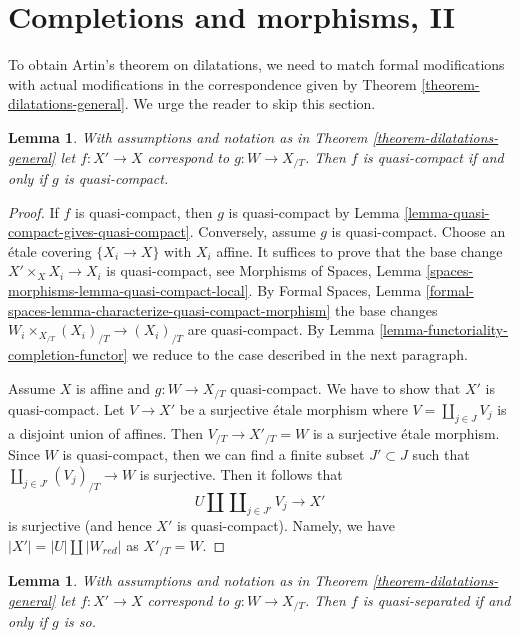 \documentclass{stacks-project}
\theoremstyle{plain}
\newtheorem{lemma}[subsection]{Lemma}
\theoremstyle{definition}
\theoremstyle{remark}
\numberwithin{equation}{subsection}
\begin{document}
\section{Completions and morphisms, II}
\label{section-completion-and-morphisms-bis}

\noindent
To obtain Artin's theorem on dilatations, we need to match
formal modifications with actual modifications in the correspondence
given by Theorem \ref{theorem-dilatations-general}.
We urge the reader to skip this section.

\begin{lemma}
\label{lemma-output-quasi-compact}
With assumptions and notation as in Theorem \ref{theorem-dilatations-general}
let $f : X' \to X$ correspond to $g : W \to X_{/T}$.
Then $f$ is quasi-compact if and only if $g$ is quasi-compact.
\end{lemma}

\begin{proof}
If $f$ is quasi-compact, then $g$ is quasi-compact by
Lemma \ref{lemma-quasi-compact-gives-quasi-compact}.
Conversely, assume $g$ is quasi-compact.
Choose an \'etale covering $\{X_i \to X\}$ with $X_i$ affine.
It suffices to prove that the base change $X' \times_X X_i \to X_i$
is quasi-compact, see
Morphisms of Spaces, Lemma \ref{spaces-morphisms-lemma-quasi-compact-local}.
By Formal Spaces, Lemma
\ref{formal-spaces-lemma-characterize-quasi-compact-morphism}
the base changes $W_i \times_{X_{/T}} (X_i)_{/T}  \to (X_i)_{/T}$
are quasi-compact.
By Lemma \ref{lemma-functoriality-completion-functor}
we reduce to the case described in the next paragraph.

\medskip\noindent
Assume $X$ is affine and $g : W \to X_{/T}$ quasi-compact.
We have to show that $X'$ is quasi-compact.
Let $V \to X'$ be a surjective \'etale morphism
where $V = \coprod_{j \in J} V_j$ is a disjoint union of affines. Then
$V_{/T} \to X'_{/T} = W$ is a surjective \'etale morphism.
Since $W$ is quasi-compact, then we can find a finite subset
$J' \subset J$ such that $\coprod_{j \in J'} (V_j)_{/T} \to W$ is surjective.
Then it follows that
$$
U \amalg \coprod\nolimits_{j \in J'} V_j \longrightarrow X'
$$
is surjective (and hence $X'$ is quasi-compact).
Namely, we have $|X'| = |U| \amalg |W_{red}|$ as $X'_{/T} = W$.
\end{proof}

\begin{lemma}
\label{lemma-output-quasi-separated}
With assumptions and notation as in Theorem \ref{theorem-dilatations-general}
let $f : X' \to X$ correspond to $g : W \to X_{/T}$.
Then $f$ is quasi-separated if and only if $g$ is so.
\end{lemma}
\end{document}
